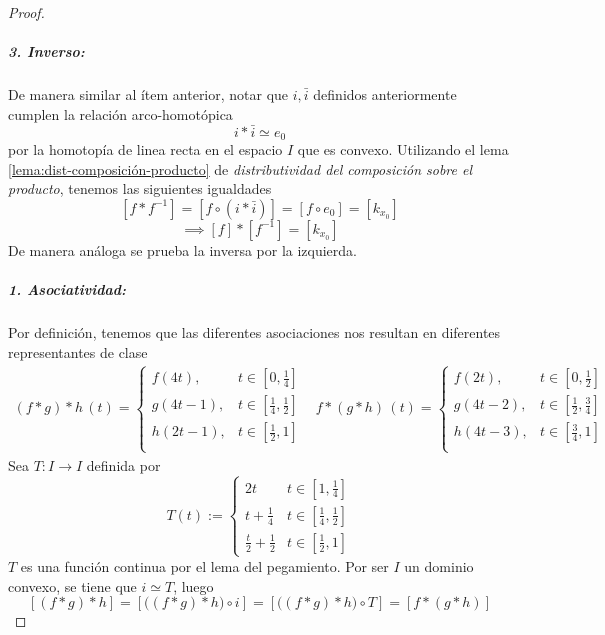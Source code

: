 \begin{proof}
\subparagraph{3. Inverso:} De manera similar al ítem anterior,
notar que \(i, \bar{i}\) definidos anteriormente cumplen la relación
arco-homotópica
\[ i * \bar{i} \simeq e_0 \]
por la homotopía de linea recta en el espacio \(I\) que es convexo.
Utilizando el lema \ref{lema:dist-composición-producto} de
\emph{distributividad del composición sobre el producto}, tenemos las
siguientes igualdades
\[ [f * f^{-1}] = [f \circ (i * \bar{i})] = [f \circ e_0] = [k_{x_0}] \]
\[ \implies [f] * [f^{-1}] = [k_{x_0}] \]
De manera análoga se prueba la inversa por la izquierda.

\subparagraph{1. Asociatividad:}
Por definición, tenemos que las diferentes asociaciones nos resultan en
diferentes representantes de clase
\[
  \begin{matrix}
    (f * g) * h \, (t) =
    \begin{cases}
      f (4t), & t \in [0, \frac 1 4] \\
      g (4t - 1), & t \in [\frac 1 4, \frac 1 2] \\
      h (2t - 1), & t \in [\frac 1 2, 1] \\
    \end{cases} &
    f * (g * h) \, (t) =
    \begin{cases}
      f (2t), & t \in [0, \frac 1 2] \\
      g (4t - 2), & t \in [\frac 1 2, \frac 3 4] \\
      h (4t - 3), & t \in [\frac 3 4, 1] \\
    \end{cases}
  \end{matrix}
\]
Sea \(T : I \to I\) definida por
\[ T (t) :=
  \begin{cases}
    2t & t \in [1 , \frac 1 4] \\
    t + \frac 1 4 & t \in [\frac 1 4, \frac 1 2] \\
    \frac t 2 + \frac 1 2 & t \in [\frac 1 2, 1]
  \end{cases}
\]
\(T\) es una función continua por el lema del pegamiento. Por ser \(I\)
un dominio convexo, se tiene que \(i \simeq T\), luego
\[ [(f * g) * h] = [\big( (f * g) * h \big) \circ i] = [\big( (f * g) *
  h \big) \circ T ] = [f * (g * h)] \]
\end{proof}
